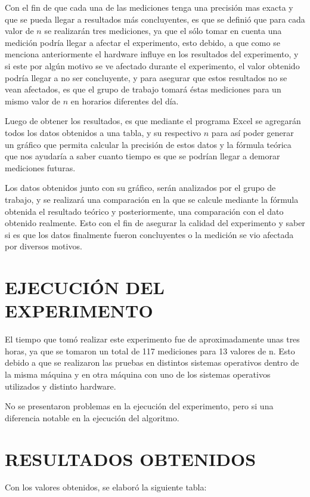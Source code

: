 \documentclass[11pt, twocolumn]{llncs}
\begin{document}
Con el fin de que cada una de las mediciones tenga una precisión mas exacta y que se pueda llegar a resultados más concluyentes, es que se definió que para cada valor de $n$ se realizarán tres mediciones, ya que el sólo tomar en cuenta una medición podría llegar a afectar el experimento, esto debido, a que como se menciona anteriormente el hardware influye en los resultados del experimento, y si este por algún motivo se ve afectado durante el experimento, el valor obtenido podría llegar a no ser concluyente, y para asegurar que estos resultados no se vean afectados, es que el grupo de trabajo tomará éstas mediciones para un mismo valor de $n$ en horarios diferentes del día.

Luego de obtener los resultados, es que mediante el programa Excel se agregarán todos los datos obtenidos a una tabla, y su respectivo $n$ para así poder generar un gráfico que permita calcular la precisión de estos datos y la fórmula teórica que nos ayudaría a saber cuanto tiempo es que se podrían llegar a demorar mediciones futuras.

Los datos obtenidos junto con su gráfico, serán analizados por el grupo de trabajo, y se realizará una comparación en la que se calcule mediante la fórmula obtenida el resultado teórico y posteriormente, una comparación con el dato obtenido realmente. Esto con el fin de asegurar la calidad del experimento y saber si es que los datos finalmente fueron concluyentes o la medición se vio afectada por diversos motivos.

\section{EJECUCIÓN DEL EXPERIMENTO}\label{ejecucion}
El tiempo que tomó realizar este experimento
fue de aproximadamente unas tres horas,
ya que se tomaron un total de 117 mediciones para 13 valores de n. Esto debido a que se realizaron las pruebas en distintos sistemas operativos dentro de la misma máquina y en otra máquina con uno de los sistemas operativos utilizados y distinto hardware.

No se presentaron problemas en la ejecución del experimento, pero si una diferencia notable en la ejecución del algoritmo.

\section{RESULTADOS OBTENIDOS}\label{resultados}
Con los valores obtenidos, se elaboró la siguiente tabla:
\end{document}
